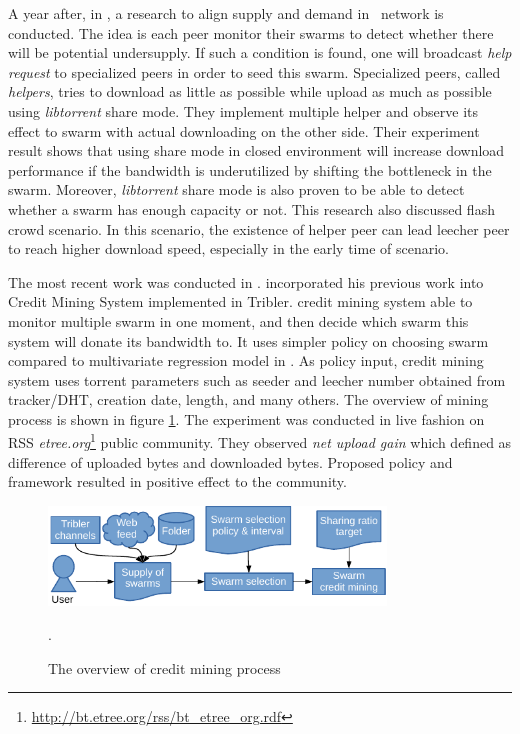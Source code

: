A year after, in \citeyear{2014:bwmarket:capota}, a research to align supply and demand in \bt~network is conducted. The idea is each peer monitor their swarms to detect whether there will be potential undersupply. If such a condition is found, one will broadcast \textit{help request} to specialized peers in order to seed this swarm. Specialized peers, called \textit{helpers}, tries to download as little as possible while upload as much as possible using \textit{libtorrent} share mode. They implement multiple helper and observe its effect to swarm with actual downloading on the other side. Their experiment result shows that using share mode in closed environment will increase download performance if the bandwidth is underutilized \cite{2014:bwmarket:capota} by shifting the bottleneck in the swarm. Moreover, \textit{libtorrent} share mode is also proven to be able to detect whether a swarm has enough capacity or not. This research also discussed flash crowd scenario. In this scenario, the existence of helper peer can lead leecher peer to reach higher download speed, especially in the early time of scenario. 

The most recent work was conducted in \citeyear{2015:creditmining:capota}\cite{2015:creditmining:capota}. \citeauthor{2015:creditmining:capota} incorporated his previous work into Credit Mining System implemented in Tribler. credit mining system able to monitor multiple swarm in one moment, and then decide which swarm this system will donate its bandwidth to. It uses simpler policy on choosing swarm compared to multivariate regression model in \cite{2013:investmentcm:capota}. As policy input, credit mining system uses torrent parameters such as seeder and leecher number obtained from tracker/DHT, creation date, length, and many others. The overview of mining process is shown in figure \ref{fig:cm15}. The experiment was conducted in live fashion on RSS \textit{etree.org}\footnote{\url{http://bt.etree.org/rss/bt\_etree\_org.rdf}} public community. They observed \textit{net upload gain} which defined as difference of uploaded bytes and downloaded bytes. Proposed policy and framework resulted in positive effect to the community.

\begin{figure}[ht]
	\centering
	\includegraphics[width=0.8\textwidth]{pics/creditmining2015.pdf}
	\caption{The overview of credit mining process \cite{2015:creditmining:capota}}.
	\label{fig:cm15}
\end{figure}


